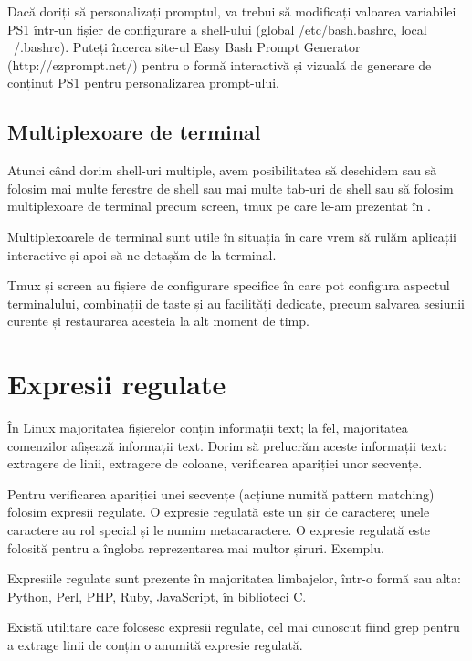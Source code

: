 Dacă doriți să personalizați promptul, va trebui să modificați valoarea
variabilei PS1 într-un fișier de configurare a shell-ului (global
/etc/bash.bashrc, local ~/.bashrc). Puteți încerca site-ul Easy Bash Prompt
Generator (http://ezprompt.net/) pentru o formă interactivă și vizuală de
generare de conținut PS1 pentru personalizarea prompt-ului.

\subsection{Multiplexoare de terminal}
\label{sec:cli-tmux}

Atunci când dorim shell-uri multiple, avem posibilitatea să deschidem sau să
folosim mai multe ferestre de shell sau mai multe tab-uri de shell sau să
folosim multiplexoare de terminal precum screen, tmux pe care le-am prezentat în
.

Multiplexoarele de terminal sunt utile în situația în care vrem să rulăm
aplicații interactive și apoi să ne detașăm de la terminal.

Tmux și screen au fișiere de configurare specifice în care pot configura
aspectul terminalului, combinații de taste și au facilități dedicate, precum
salvarea sesiunii curente și restaurarea acesteia la alt moment de timp.

\section{Expresii regulate}
\label{sec:cli-regex}

În Linux majoritatea fișierelor conțin informații text; la fel, majoritatea
comenzilor afișează informații text. Dorim să prelucrăm aceste informații text:
extragere de linii, extragere de coloane, verificarea apariției unor secvențe.

Pentru verificarea apariției unei secvențe (acțiune numită pattern matching)
folosim expresii regulate. O expresie regulată este un șir de caractere; unele
caractere au rol special și le numim metacaractere. O expresie regulată este
folosită pentru a îngloba reprezentarea mai multor șiruri. Exemplu.

Expresiile regulate sunt prezente în majoritatea limbajelor, într-o formă sau
alta: Python, Perl, PHP, Ruby, JavaScript, în biblioteci C.

Există utilitare care folosesc expresii regulate, cel mai cunoscut fiind grep
pentru a extrage linii de conțin o anumită expresie regulată.

